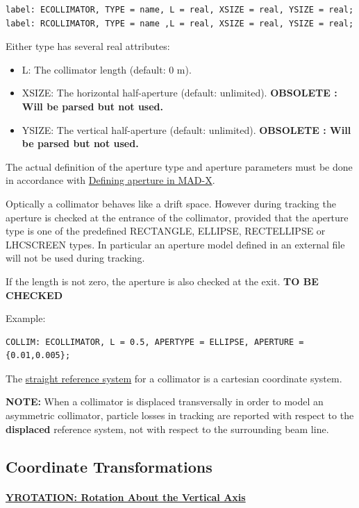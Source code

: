 \begin{verbatim}
label: ECOLLIMATOR, TYPE = name, L = real, XSIZE = real, YSIZE = real;
label: RCOLLIMATOR, TYPE = name ,L = real, XSIZE = real, YSIZE = real;
\end{verbatim}  

Either type has several real attributes: 
\begin{itemize}
   \item L: The collimator length (default: 0 m). 
   \item XSIZE: The horizontal half-aperture (default:
     unlimited). \textbf{OBSOLETE : Will be parsed but not used.} 
   \item YSIZE: The vertical half-aperture (default:
     unlimited). \textbf{OBSOLETE : Will be parsed but not used.} 
\end{itemize}  

The actual definition of the aperture type and aperture parameters must
be done in accordance with \href{aperture.html}{Defining aperture in
  MAD-X}.   

Optically a collimator behaves like a drift space.  However during
tracking the aperture is checked at the entrance of the collimator,
provided that the aperture type is one of the predefined RECTANGLE,
ELLIPSE, RECTELLIPSE or LHCSCREEN types.  In particular an aperture
model defined in an external file will not be used during tracking.  

If the length is not zero, the aperture is also checked at the
exit. \textbf{ TO BE CHECKED } 

Example: 
\begin{verbatim}
COLLIM: ECOLLIMATOR, L = 0.5, APERTYPE = ELLIPSE, APERTURE = {0.01,0.005};
\end{verbatim}

The \href{local_system.html#straight}{straight reference system} for a
collimator is a cartesian coordinate system.  

\textbf{NOTE:} When a collimator is displaced transversally in order to
model  an asymmetric collimator, particle losses in tracking are
reported with respect to the \textbf{displaced} reference system, not
with respect to the surrounding beam line.  


%
\subsection{Coordinate Transformations}

\paragraph{\href{yrotation}{YROTATION: Rotation About the Vertical Axis}}

